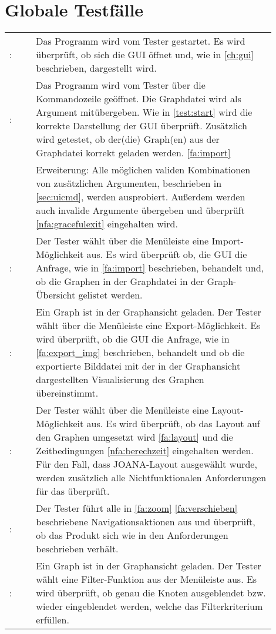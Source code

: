 \chapter{Globale Testfälle}

\setcounter{tnr}{10}
\newcommand{\testno}{\ifnum\value{tnr}<10 00\else\ifnum\value{tnr}<100 0\fi\fi\arabic{tnr}\addtocounter{tnr}{10}}
\newcommand\test[2]{\namedlabel{test:#1}{\textbf{/T\testno/}}: & #2 \\ [1ex] }
\newcommand\etest[3]{\namedlabel{test:#1}{\textbf{/T\testno/}}: & #2 \\ & Erweiterung: #3 \\ [1ex] }

\begin{tabular}{lp{0.9\linewidth}}
  \test{start}{Das Programm wird vom Tester gestartet.
    Es wird überprüft, ob sich die GUI öffnet und, wie in \ref{ch:gui} beschrieben, dargestellt wird.}
  \etest{startcmd}{Das Programm wird vom Tester über die Kommandozeile geöffnet.
    Die Graphdatei wird als Argument mitübergeben.
    Wie in \ref{test:start} wird die korrekte Darstellung der GUI überprüft.
    Zusätzlich wird getestet, ob der(die) Graph(en) aus der Graphdatei korrekt geladen werden. \ref{fa:import}}
    {Alle möglichen validen Kombinationen von zusätzlichen Argumenten, beschrieben in \ref{sec:uicmd}, werden ausprobiert.
    Außerdem werden auch invalide Argumente übergeben und überprüft \ref{nfa:gracefulexit} eingehalten wird.}
  \test{import}{Der Tester wählt über die Menüleiste eine Import-Möglichkeit aus.
    Es wird überprüft ob, die GUI die Anfrage, wie in \ref{fa:import} beschrieben,
    behandelt und, ob die Graphen in der Graphdatei in der Graph-Übersicht gelistet werden.}
  \test{export}{Ein Graph ist in der Graphansicht geladen.
    Der Tester wählt über die Menüleiste eine Export-Möglichkeit.
    Es wird überprüft, ob die GUI die Anfrage, wie in \ref{fa:export_img} beschrieben,
    behandelt und ob die exportierte Bilddatei mit der in der Graphansicht dargestellten Visualisierung des Graphen übereinstimmt.}
  \test{layouten}{Der Tester wählt über die Menüleiste eine Layout-Möglichkeit aus.
    Es wird überprüft, ob das Layout auf den Graphen umgesetzt wird \ref{fa:layout}
    und die Zeitbedingungen \ref{nfa:berechzeit} eingehalten werden.
    Für den Fall, dass JOANA-Layout ausgewählt wurde,
    werden zusätzlich alle Nichtfunktionalen Anforderungen für das \nameref{sec:nfajoana} überprüft.}
  \test{navigation}{Der Tester führt alle in \ref{fa:zoom} \ref{fa:verschieben} beschriebene Navigationsaktionen aus
    und überprüft, ob das Produkt sich wie in den Anforderungen beschrieben verhält.}
  \test{filter}{Ein Graph ist in der Graphansicht geladen.
    Der Tester wählt eine Filter-Funktion aus der Menüleiste aus.
    Es wird überprüft, ob genau die Knoten ausgeblendet bzw. wieder eingeblendet werden, welche das Filterkriterium erfüllen.}
\end{tabular}
